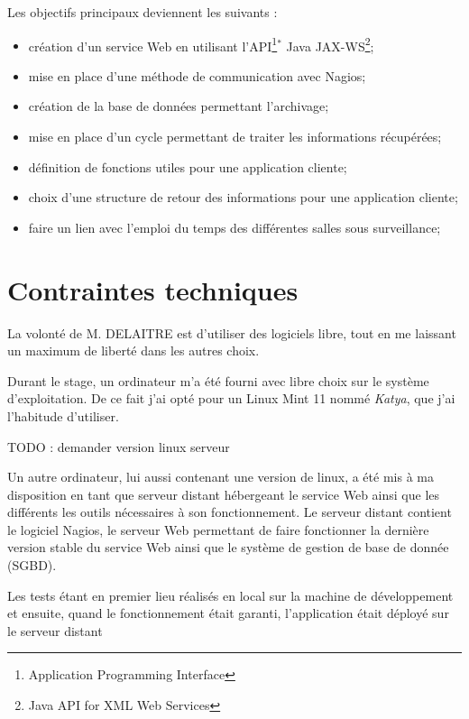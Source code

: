 \noindent Les objectifs principaux deviennent les suivants :
\begin{itemize}
	\item cr\'eation d'un service Web en utilisant l'API\protect\footnote{Application Programming Interface}$^*$ Java JAX-WS\protect\footnote{Java API for XML Web Services};
	\item mise en place d'une m\'ethode de communication avec Nagios;
	\item cr\'eation de la base de donn\'ees permettant l'archivage;
	\item mise en place d'un cycle permettant de traiter les informations r\'ecup\'er\'ees;
	\item d\'efinition de fonctions utiles pour une application cliente;
	\item choix d'une structure de retour des informations pour une application cliente;
	\item faire un lien avec l'emploi du temps des diff\'erentes salles sous surveillance;

\end{itemize}

\section{Contraintes techniques}

La volont\'e de M. DELAITRE est d'utiliser des logiciels libre, tout en me laissant un maximum de libert\'e dans les autres choix.

Durant le stage, un ordinateur m'a \'et\'e fourni avec libre choix sur le syst\`eme d'exploitation.
De ce fait j'ai opt\'e pour un Linux Mint 11 nomm\'e \textit{Katya}, que j'ai l'habitude d'utiliser.

 TODO : demander version linux serveur

Un autre ordinateur, lui aussi contenant une version de linux, a \'et\'e mis \`a ma disposition en tant que serveur distant h\'ebergeant le service Web ainsi que les diff\'erents les outils n\'ecessaires \`a son fonctionnement.
Le serveur distant contient le logiciel Nagios, le serveur Web permettant de faire fonctionner la derni\`ere version stable du service Web ainsi que le syst\`eme de gestion de base de donn\'ee (SGBD).

Les tests \'etant en premier lieu r\'ealis\'es en local sur la machine de d\'eveloppement et ensuite, quand le fonctionnement \'etait garanti, l'application \'etait d\'eploy\'e sur le serveur distant



\clearpage
